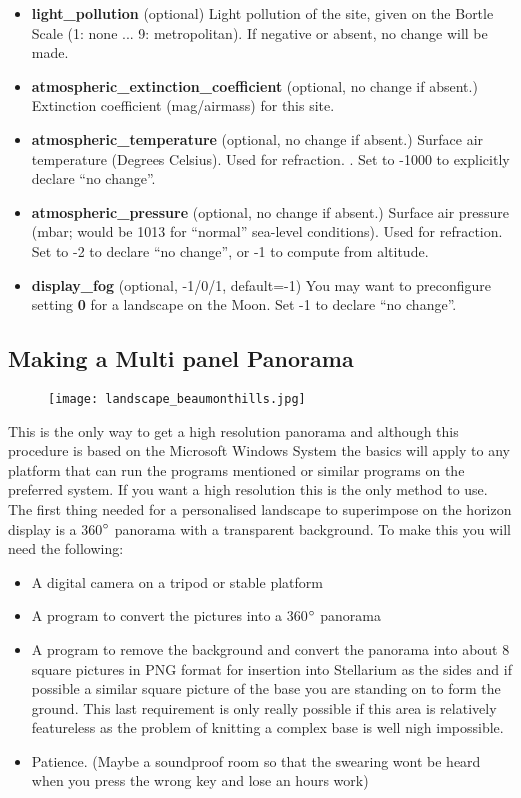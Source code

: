 \begin{itemize}
\item
  \textbf{light\_pollution} (optional) Light pollution of the site,
  given on the Bortle Scale (1: none ... 9: metropolitan). If negative
  or absent, no change will be made.
\item
  \textbf{atmospheric\_extinction\_coefficient} (optional, no change if
  absent.) Extinction coefficient (mag/airmass) for this site.
\item
  \textbf{atmospheric\_temperature} (optional, no change if absent.)
  Surface air temperature (Degrees Celsius). Used for refraction. . Set
  to -1000 to explicitly declare ``no change''.
\item
  \textbf{atmospheric\_pressure} (optional, no change if absent.)
  Surface air pressure (mbar; would be 1013 for ``normal'' sea-level
  conditions). Used for refraction. Set to -2 to declare ``no change'',
  or -1 to compute from altitude.
\item
  \textbf{display\_fog} (optional, -1/0/1, default=-1) You may want to
  preconfigure setting \textbf{0} for a landscape on the Moon. Set -1 to
  declare ``no change''.
\end{itemize}

\subsection{Making a Multi panel
Panorama}\label{making-a-multi-panel-panorama}

\begin{figure}[h]
\centering\texttt{[image: landscape\_beaumonthills.jpg]}
\end{figure}

This is the only way to get a high resolution panorama and although this
procedure is based on the Microsoft Windows System the basics will apply
to any platform that can run the programs mentioned or similar programs
on the preferred system. If you want a high resolution this is the only
method to use. The first thing needed for a personalised landscape to
superimpose on the horizon display is a 360$\degree$ panorama with a transparent
background. To make this you will need the following:

\begin{itemize}
\item
  A digital camera on a tripod or stable platform
\item
  A program to convert the pictures into a 360$\degree$ panorama
\item
  A program to remove the background and convert the panorama into about
  8 square pictures in PNG format for insertion into Stellarium as the
  sides and if possible a similar square picture of the base you are
  standing on to form the ground. This last requirement is only really
  possible if this area is relatively featureless as the problem of
  knitting a complex base is well nigh impossible.
\item
  Patience. (Maybe a soundproof room so that the swearing wont be heard
  when you press the wrong key and lose an hours work)
\end{itemize}

